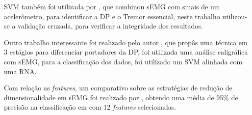 SVM também foi utilizada por \cite{kugler2013automated}, que combinou sEMG com sinais de um acelerômetro, para identificar a DP e o Tremor essencial, neste trabalho utilizou-se a validação cruzada, para verificar a integridade dos resultados.

Outro trabalho interessante foi realizado pelo autor , que propôs uma técnica em 3 estágios para diferenciar portadores da DP, foi utilizada uma análise caligráfica com sEMG, para a classificação dos dados, foi utilizado um SVM alinhada com uma RNA.

Com relação as \textit{features}, um comparativo sobre as estratégias de redução de dimensionalidade em sEMG foi realizado por \cite{liu2014feature}, obtendo uma média de 95\% de precisão na classificação em com 12 \textit{features} selecionadas. 